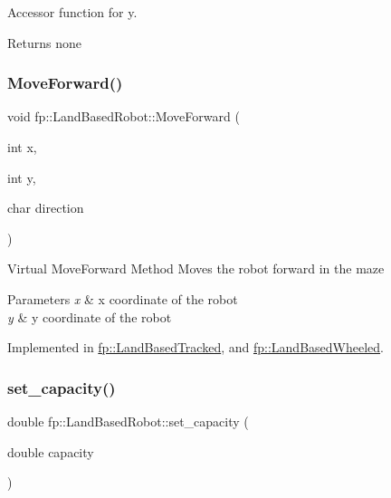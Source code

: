 Accessor function for y. 

\begin{DoxyReturn}{Returns}
none 
\end{DoxyReturn}
\mbox{\label{classfp_1_1_land_based_robot_a370d28ef28553e8e7a56b1ea68884bb0}} 
\subsubsection{\texorpdfstring{Move\+Forward()}{MoveForward()}}
{\footnotesize\ttfamily void fp\+::\+Land\+Based\+Robot\+::\+Move\+Forward (\begin{DoxyParamCaption}\item[{int}]{x,  }\item[{int}]{y,  }\item[{char}]{direction }\end{DoxyParamCaption})\hspace{0.3cm}{\ttfamily [pure virtual]}}

Virtual Move\+Forward Method Moves the robot forward in the maze 
\begin{DoxyParams}{Parameters}
{\em x} & x coordinate of the robot \\
\hline
{\em y} & y coordinate of the robot \\
\hline
\end{DoxyParams}


Implemented in \hyperlink{classfp_1_1_land_based_tracked_a3f4290b614fe0e31e361366e71501cea}{fp\+::\+Land\+Based\+Tracked}, and \hyperlink{classfp_1_1_land_based_wheeled_a90ab977baecc518185c950b08c56dfc5}{fp\+::\+Land\+Based\+Wheeled}.

\mbox{\label{classfp_1_1_land_based_robot_a3db2d374deb78e67c19bdf07bca9d771}} 
\subsubsection{\texorpdfstring{set\+\_\+capacity()}{set\_capacity()}}
{\footnotesize\ttfamily double fp\+::\+Land\+Based\+Robot\+::set\+\_\+capacity (\begin{DoxyParamCaption}\item[{double}]{capacity }\end{DoxyParamCaption})\hspace{0.3cm}{\ttfamily [inline]}}

